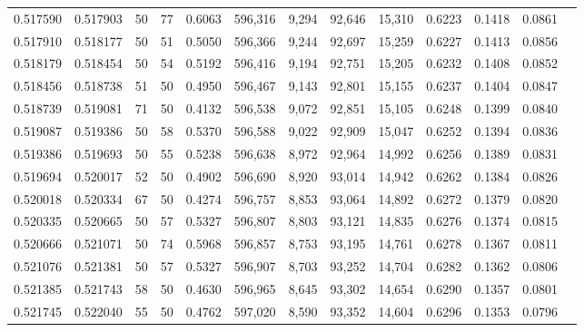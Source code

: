 \begin{tabular}{rrrrrrrrrrrrr}
0.517590 & 0.517903 &    50 &  77 &                                     0.6063 & 596,316 &   9,294 &  92,646 &  15,310 & 0.6223 & 0.1418 & 0.0861 \\
0.517910 & 0.518177 &    50 &  51 &                                     0.5050 & 596,366 &   9,244 &  92,697 &  15,259 & 0.6227 & 0.1413 & 0.0856 \\
0.518179 & 0.518454 &    50 &  54 &                                     0.5192 & 596,416 &   9,194 &  92,751 &  15,205 & 0.6232 & 0.1408 & 0.0852 \\
0.518456 & 0.518738 &    51 &  50 &                                     0.4950 & 596,467 &   9,143 &  92,801 &  15,155 & 0.6237 & 0.1404 & 0.0847 \\
0.518739 & 0.519081 &    71 &  50 &                                     0.4132 & 596,538 &   9,072 &  92,851 &  15,105 & 0.6248 & 0.1399 & 0.0840 \\
0.519087 & 0.519386 &    50 &  58 &                                     0.5370 & 596,588 &   9,022 &  92,909 &  15,047 & 0.6252 & 0.1394 & 0.0836 \\
0.519386 & 0.519693 &    50 &  55 &                                     0.5238 & 596,638 &   8,972 &  92,964 &  14,992 & 0.6256 & 0.1389 & 0.0831 \\
0.519694 & 0.520017 &    52 &  50 &                                     0.4902 & 596,690 &   8,920 &  93,014 &  14,942 & 0.6262 & 0.1384 & 0.0826 \\
0.520018 & 0.520334 &    67 &  50 &                                     0.4274 & 596,757 &   8,853 &  93,064 &  14,892 & 0.6272 & 0.1379 & 0.0820 \\
0.520335 & 0.520665 &    50 &  57 &                                     0.5327 & 596,807 &   8,803 &  93,121 &  14,835 & 0.6276 & 0.1374 & 0.0815 \\
0.520666 & 0.521071 &    50 &  74 &                                     0.5968 & 596,857 &   8,753 &  93,195 &  14,761 & 0.6278 & 0.1367 & 0.0811 \\
0.521076 & 0.521381 &    50 &  57 &                                     0.5327 & 596,907 &   8,703 &  93,252 &  14,704 & 0.6282 & 0.1362 & 0.0806 \\
0.521385 & 0.521743 &    58 &  50 &                                     0.4630 & 596,965 &   8,645 &  93,302 &  14,654 & 0.6290 & 0.1357 & 0.0801 \\
0.521745 & 0.522040 &    55 &  50 &                                     0.4762 & 597,020 &   8,590 &  93,352 &  14,604 & 0.6296 & 0.1353 & 0.0796 \\

\end{tabular}
